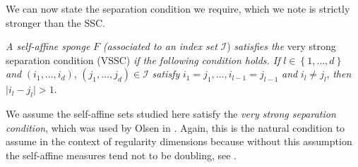 We can now state the separation condition we require, which we note is strictly stronger than the SSC.

\begin{definition}
	\emph{A self-affine sponge }$F$\emph{ (associated to an index set }$\mathcal{I}$)\emph{ satisfies the }very strong separation condition (VSSC)\emph{ if the following condition  holds. If }$l \in  \left\{1, \ldots, d\right\}$\emph{ and }$(i_1, \ldots, i_d)$, $(j_1 ,\ldots, j_d)\in \mathcal{I}$\emph{ satisfy }$i_1=j_1, \ldots,  i_{l-1}=j_{l-1}$\emph{ and }$i_l \neq j_l$,\emph{ then }$\lvert i_l - j_l \rvert >1$.
\end{definition} 


We assume the self-affine sets studied here satisfy the \emph{very strong separation condition}, which was used by Olsen in \cite{sponges}. Again, this is the natural condition to assume in the context of regularity dimensions because without this assumption the self-affine measures tend not to be doubling, see \cite{doublingcarpets, fraser-howroyd1}. 

